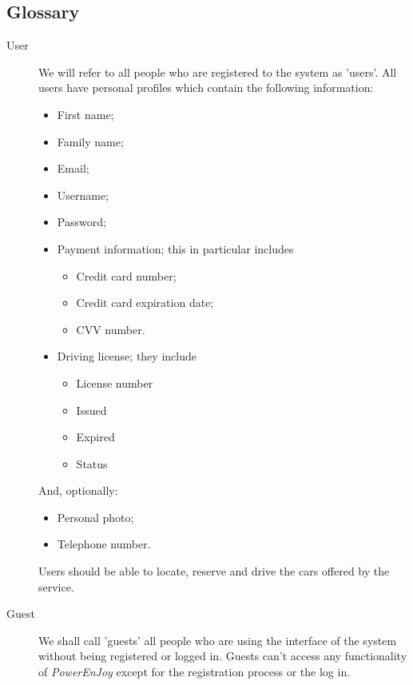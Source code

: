 \documentclass{article}
\begin{document}
		\subsection{Glossary}
			\begin{description}
				\item[User] We will refer to all people who are registered to the system as 'users'. All users have personal profiles which contain the following information:
				\begin{itemize}
					\item First name;
					\item Family name; %
					\item Email;
					\item Username;
					\item Password;
					\item Payment information; this in particular includes
						\begin{itemize}
							\item Credit card number;
							\item Credit card expiration date;
							\item CVV number. %
						\end{itemize}
					\item Driving license; they include
						\begin{itemize}
							\item License number
							\item Issued
							\item Expired
							\item Status
						\end{itemize}
				\end{itemize}
				And, optionally:
				\begin{itemize}		
					\item Personal photo;
					\item Telephone number.
				\end{itemize}
				Users should be able to locate, reserve and drive the cars offered by the service. 
				
				\item[Guest] We shall call 'guests' all people who are using the interface of the system without being registered or logged in. Guests can't access any functionality of \textit{PowerEnJoy} except for the registration process or the log in. 
				

\end{description}
\end{document}
